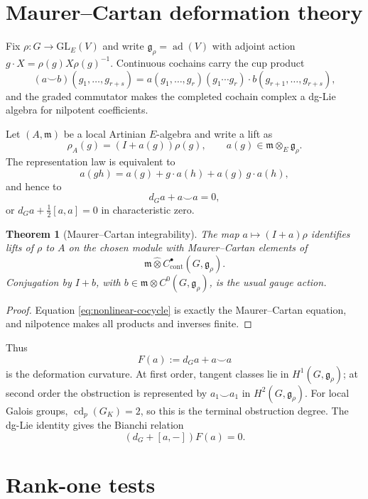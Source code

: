 \documentclass[11pt]{article}
\newtheorem{theorem}{Theorem}[section]
\theoremstyle{definition}
\newcommand{\ad}{\operatorname{ad}}
\begin{document}
\section{Maurer--Cartan deformation theory}\label{sec:deformation}

Fix $\rho:G\to\mathrm{GL}_E(V)$ and write $\mathfrak g_\rho=\ad(V)$ with adjoint action $g\cdot X=\rho(g)X\rho(g)^{-1}$.  Continuous cochains carry the cup product
\[
(a\smile b)(g_1,\dots,g_{r+s})
=a(g_1,\dots,g_r)(g_1\cdots g_r)\cdot b(g_{r+1},\dots,g_{r+s}),
\]
and the graded commutator makes the completed cochain complex a dg-Lie algebra for nilpotent coefficients.

Let $(A,\mathfrak m)$ be a local Artinian $E$-algebra and write a lift as
\[
\rho_A(g)=(I+a(g))\rho(g),
\qquad a(g)\in\mathfrak m\otimes_E\mathfrak g_\rho.
\]
The representation law is equivalent to
\begin{equation}\label{eq:nonlinear-cocycle}
a(gh)=a(g)+g\cdot a(h)+a(g)\,g\cdot a(h),
\end{equation}
and hence to
\begin{equation}\label{eq:MC}
d_Ga+a\smile a=0,
\end{equation}
or $d_Ga+\frac12[a,a]=0$ in characteristic zero.

\begin{theorem}[Maurer--Cartan integrability]\label{thm:MC}
The map $a\mapsto(I+a)\rho$ identifies lifts of $\rho$ to $A$ on the chosen module with Maurer--Cartan elements of
\[
\mathfrak m\widehat\otimes C^\bullet_{\mathrm{cont}}(G,\mathfrak g_\rho).
\]
Conjugation by $I+b$, with $b\in\mathfrak m\otimes C^0(G,\mathfrak g_\rho)$, is the usual gauge action.
\end{theorem}

\begin{proof}
Equation \eqref{eq:nonlinear-cocycle} is exactly the Maurer--Cartan equation, and nilpotence makes all products and inverses finite.
\end{proof}

Thus
\[
F(a):=d_Ga+a\smile a
\]
is the deformation curvature.  At first order, tangent classes lie in $H^1(G,\mathfrak g_\rho)$; at second order the obstruction is represented by $a_1\smile a_1$ in $H^2(G,\mathfrak g_\rho)$.  For local Galois groups, $\operatorname{cd}_p(G_K)=2$, so this is the terminal obstruction degree.  The dg-Lie identity gives the Bianchi relation
\[
(d_G+[a,-])F(a)=0.
\]

\section{Rank-one tests}
\end{document}
